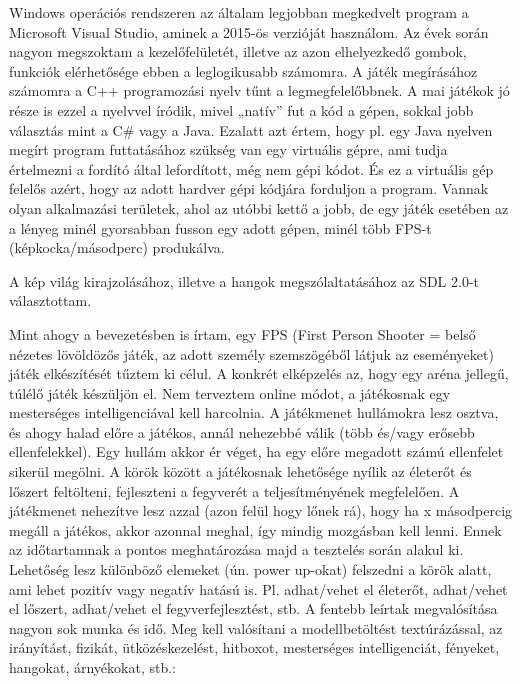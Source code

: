 \label{Chap:komponensek}


Windows operációs rendszeren az általam legjobban megkedvelt program a Microsoft Visual Studio, aminek a 2015-ös verzióját használom. Az évek során nagyon megszoktam a kezelőfelületét, illetve az azon elhelyezkedő gombok, funkciók elérhetősége ebben a leglogikusabb számomra. A játék megírásához számomra a C++ programozási nyelv tűnt a legmegfelelőbbnek. A mai játékok jó része is ezzel a nyelvvel íródik, mivel „natív” fut a kód a gépen, sokkal jobb választás mint a C\# vagy a Java. Ezalatt azt értem, hogy pl. egy Java nyelven megírt program futtatásához szükség van egy virtuális gépre, ami tudja értelmezni a fordító által lefordított, még nem gépi kódot. És ez a virtuális gép felelős azért, hogy az adott hardver gépi kódjára forduljon a program. Vannak olyan alkalmazási területek, ahol az utóbbi kettő a jobb, de egy játék esetében az a lényeg minél gyorsabban fusson egy adott gépen, minél több FPS-t (képkocka/másodperc) produkálva.

A kép világ kirajzolásához, illetve a hangok megszólaltatásához az SDL 2.0-t választottam.



Mint ahogy a bevezetésben is írtam, egy FPS (First Person Shooter = belső nézetes lövöldözős játék, az adott személy szemszögéből látjuk az eseményeket) játék elkészítését tűztem ki célul. A konkrét elképzelés az, hogy egy aréna jellegű, túlélő játék készüljön el. Nem terveztem online módot, a játékosnak egy mesterséges intelligenciával kell harcolnia. A játékmenet hullámokra lesz osztva, és ahogy halad előre a játékos, annál nehezebbé válik (több és/vagy erősebb ellenfelekkel). Egy hullám akkor ér véget, ha egy előre megadott számú ellenfelet sikerül megölni. A körök között a játékosnak lehetősége nyílik az életerőt és lőszert feltölteni, fejleszteni a fegyverét a teljesítményének megfelelően. A játékmenet nehezítve lesz azzal (azon felül hogy lőnek rá), hogy ha x másodpercig megáll a játékos, akkor azonnal meghal, így mindig mozgásban kell lenni. Ennek az időtartamnak a pontos meghatározása majd a tesztelés során alakul ki. Lehetőség lesz különböző elemeket (ún. power up-okat) felszedni a körök alatt, ami lehet pozitív vagy negatív hatású is. Pl. adhat/vehet el életerőt, adhat/vehet el lőszert, adhat/vehet el fegyverfejlesztést, stb.
A fentebb leírtak megvalósítása nagyon sok munka és idő. Meg kell valósítani a modellbetöltést textúrázással, az irányítást, fizikát, ütközéskezelést, hitboxot, mesterséges intelligenciát, fényeket, hangokat, árnyékokat, stb.:

